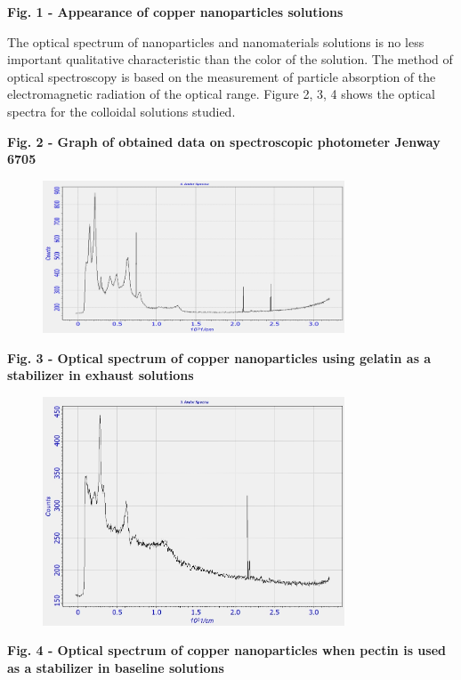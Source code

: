 {\bfseries Fig. 1 - Appearance of copper nanoparticles solutions}

The optical spectrum of nanoparticles and nanomaterials solutions is no
less important qualitative characteristic than the color of the
solution. The method of optical spectroscopy is based on the measurement
of particle absorption of the electromagnetic radiation of the optical
range. Figure 2, 3, 4 shows the optical spectra for the colloidal
solutions studied.

{\bfseries Fig. 2 - Graph of obtained data on spectroscopic photometer
Jenway 6705}

\begin{figure}[H]
	\centering
	\includegraphics[width=0.8\textwidth]{assets/15}
	\caption*{}
\end{figure}

{\bfseries Fig. 3 - Optical spectrum of copper nanoparticles using gelatin
as a stabilizer in exhaust solutions}

\begin{figure}[H]
	\centering
	\includegraphics[width=0.8\textwidth]{assets/16}
	\caption*{}
\end{figure}

{\bfseries Fig. 4 - Optical spectrum of copper nanoparticles when pectin is
used as a stabilizer in baseline solutions}

